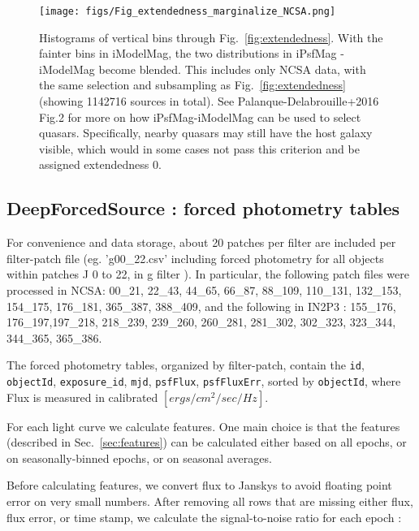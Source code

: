 \documentclass[fleqn,usenatbib]{mnras}  %
\begin{document}
\begin{figure*}
\texttt{[image: figs/Fig\_extendedness\_marginalize\_NCSA.png]}
\caption{Histograms of vertical bins through Fig.~\ref{fig:extendedness}. With the fainter bins in iModelMag, the two distributions in iPsfMag - iModelMag become blended. This includes only NCSA data, with the same selection and subsampling as Fig.~\ref{fig:extendedness} (showing 1142716 sources in total).
See Palanque-Delabrouille+2016 Fig.2 for more on how iPsfMag-iModelMag can be used to select quasars. Specifically, nearby quasars may still have the host galaxy visible, which would in some cases not pass this criterion and be assigned extendedness 0. }
\label{fig:extendedness_marginalized}
\end{figure*}



\subsection{DeepForcedSource : forced photometry tables}


For convenience and  data storage, about 20 patches per filter are included per filter-patch file (eg. 'g00\_22.csv' including forced photometry for all objects within patches J 0 to 22, in g filter  ). In particular, the following patch files  were processed in NCSA: 00\_21, 22\_43, 44\_65, 66\_87, 88\_109, 110\_131, 132\_153, 154\_175, 176\_181, 365\_387, 388\_409,  and the following in IN2P3 : 155\_176, 176\_197,197\_218, 218\_239, 239\_260, 260\_281, 281\_302, 302\_323, 323\_344, 344\_365, 365\_386.


The forced photometry tables, organized by filter-patch, contain the \verb|id|, \verb|objectId|, \verb|exposure_id|, \verb|mjd|, \verb|psfFlux|, \verb|psfFluxErr|, sorted by \verb|objectId|, where Flux is measured in calibrated $[ergs/ cm^{2} / sec / Hz]$.  


For each light curve we calculate features. One main choice is that the features (described in  Sec.~\ref{sec:features}) can be calculated either based on all epochs, or on  seasonally-binned epochs, or on seasonal averages. 

Before calculating features, we convert flux to Janskys to avoid floating point error on very small numbers.  After removing all rows that are missing either flux, flux error, or time stamp,  we calculate the signal-to-noise ratio for each epoch : 
\end{document}
